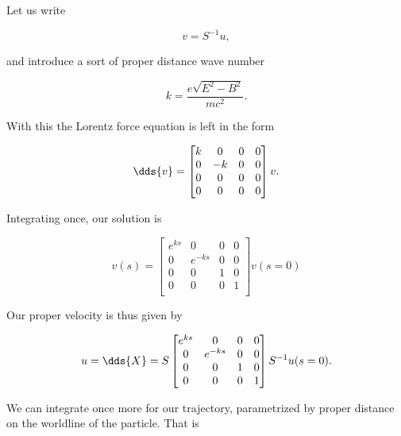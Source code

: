 {Let us write

\begin{equation}\label{eqn:relElectroDynProblemSet2:790}
v = S^{-1} u,
\end{equation}

and introduce a sort of proper distance wave number

\begin{equation}\label{eqn:relElectroDynProblemSet2:810}
k = \frac{e \sqrt{E^2 - B^2}}{m c^2}.
\end{equation}

With this the Lorentz force equation is left in the form

\begin{equation}\label{eqn:relElectroDynProblemSet2:830}
\dds{v} = 
\begin{bmatrix}
k & 0 & 0 & 0 \\
0 & -k & 0 & 0 \\
0 & 0 & 0 & 0 \\
0 & 0 & 0 & 0 \\
\end{bmatrix} v.
\end{equation}

Integrating once, our solution is

\begin{equation}\label{eqn:relElectroDynProblemSet2:850}
v(s) = 
\begin{bmatrix}
e^{ks} & 0 & 0 & 0 \\
0 & e^{-ks} & 0 & 0 \\
0 & 0 & 1 & 0 \\
0 & 0 & 0 & 1 \\
\end{bmatrix} v(s=0)
\end{equation}

Our proper velocity is thus given by

\begin{equation}\label{eqn:relElectroDynProblemSet2:870}
u = \dds{X} = S 
\begin{bmatrix}
e^{ks} & 0 & 0 & 0 \\
0 & e^{-ks} & 0 & 0 \\
0 & 0 & 1 & 0 \\
0 & 0 & 0 & 1 \\
\end{bmatrix} S^{-1} u(s=0).
\end{equation}

We can integrate once more for our trajectory, parametrized by proper distance on the worldline of the particle.  That is

}
